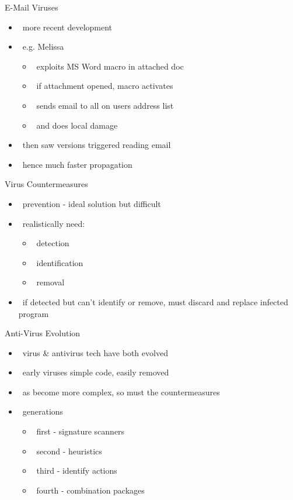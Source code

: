 \documentclass{beamer}
\begin{document}
\begin{frame}{E-Mail Viruses }
  \begin{itemize}
  \item  more recent development 
  \item  e.g. Melissa 
    \begin{itemize}
    \item  exploits MS Word macro in attached doc 
    \item  if attachment opened, macro activates 
    \item  sends email to all on users address list 
    \item  and does local damage 
    \end{itemize}
  \item  then saw versions triggered reading email 
  \item  hence much faster propagation
  \end{itemize}
\end{frame}

\begin{frame}{Virus Countermeasures}
  \begin{itemize}
  \item  prevention - ideal solution but difficult 
  \item  realistically need: 
    \begin{itemize}
    \item  detection 
    \item  identification 
    \item  removal 
    \end{itemize}
  \item  if detected but can't identify or remove, must 
    discard and replace infected program
  \end{itemize}
\end{frame}

\begin{frame}{Anti-Virus Evolution }
  \begin{itemize}
  \item  virus \& antivirus tech have both evolved 
  \item  early viruses simple code, easily removed 
  \item  as become more complex, so must the 
    countermeasures 
  \item  generations 
    \begin{itemize}
    \item  first - signature scanners 
    \item  second - heuristics 
    \item  third - identify actions 
    \item  fourth - combination packages 
    \end{itemize}
  \end{itemize}
\end{frame}
\end{document}
